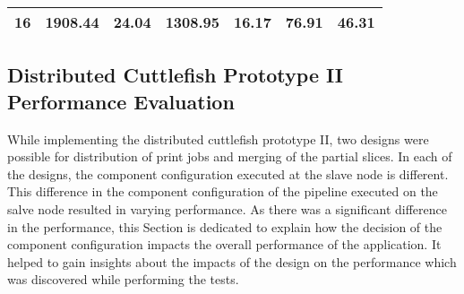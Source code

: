 \begin{table}
\begin{tabular}{|l|l|l|l|l|l|l|}
16                                                                                  & 1908.44                                                                                                                   & 24.04                                                                                                                                        & 1308.95                                                                                                                                        & 16.17                                                                                                                                         & 76.91                                                                                                                                     & 46.31                                                                                                                                       \\ \hline
\end{tabular}
\end{table}


\subsection{Distributed Cuttlefish Prototype II Performance Evaluation} \label{ProtoIIDesigns}

While implementing the distributed cuttlefish prototype II, two designs were possible for distribution of print jobs and merging of the partial slices. In each of the designs, the component configuration executed at the slave node is different. This difference in the component configuration of the pipeline executed on the salve node resulted in varying performance. As there was a significant difference in the performance, this Section is dedicated to explain how the decision of the component configuration impacts the overall performance of the application. It helped to gain insights about the impacts of the design on the performance which was discovered while performing the tests. \newline

